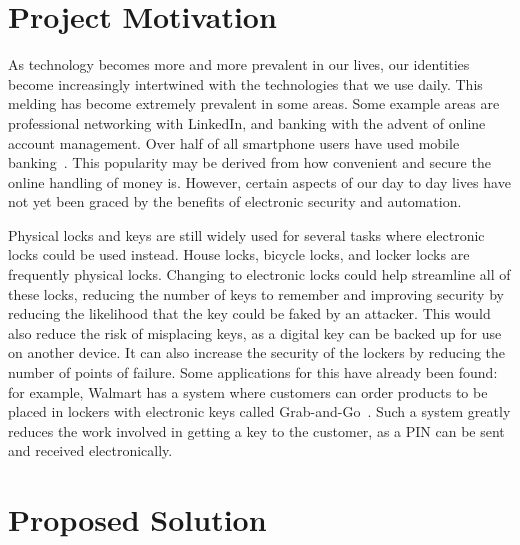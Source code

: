 \documentclass[12pt]{report}
\let\Oldsection\section
\renewcommand{\section}{\FloatBarrier\Oldsection}
\begin{document}

\section{Project Motivation} \label{project-motivation}

As technology becomes more and more prevalent in our lives, our identities become increasingly intertwined with the
technologies that we use daily. This melding has become extremely prevalent in some areas. Some example areas are
professional networking with LinkedIn, and banking with the advent of online account management. Over half of all
smartphone users have used mobile banking~\autocite{MOBILEBANKING}. This popularity may be derived
from how convenient and secure the online handling of money is. However, certain aspects of our day to day lives
have not yet been graced by the benefits of electronic security and automation.

Physical locks and keys are still widely used for several tasks where electronic locks could be used instead. House
locks, bicycle locks, and locker locks are frequently physical locks. Changing to electronic locks could help streamline
all of these locks, reducing the number of keys to remember and improving security by reducing the likelihood that the
key could be faked by an attacker. This would also reduce the risk of misplacing keys, as a digital key can be backed 
up for use on another device. It can also increase the security of the lockers by reducing the number of points of failure.
Some applications for this have already been found: for example, Walmart has a system 
where customers can order products to be placed in lockers with electronic keys called Grab-and-Go~\autocite{WALMART}. 
Such a system greatly reduces the work involved in getting a key to the customer, as a PIN can be sent and received 
electronically.

\section{Proposed Solution} \label{proposed-solution}
\end{document}
